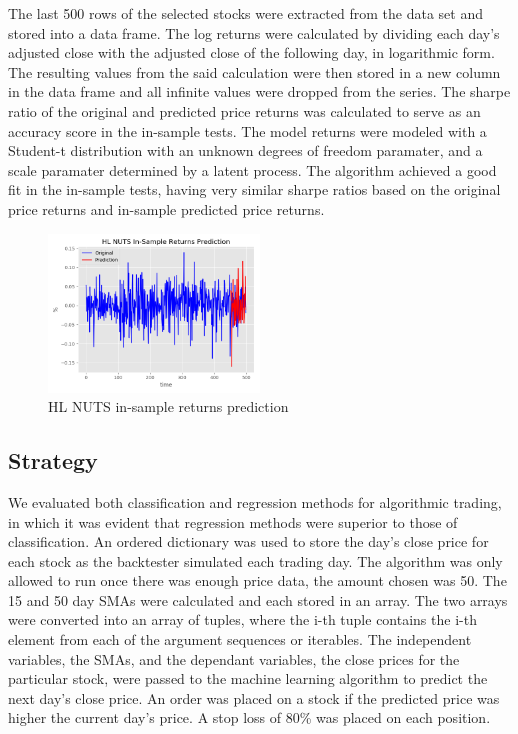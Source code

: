 \documentclass[times]{jtitauth}
\begin{document}
The last 500 rows of the selected stocks were extracted from the data set and stored into a data frame. The log returns were calculated by dividing each day’s adjusted close with the adjusted close of the following day, in logarithmic form. The resulting values from the said calculation were then stored in a new column in the data frame and all infinite values were dropped from the series. The sharpe ratio of the original and predicted price returns was calculated to serve as an accuracy score in the in-sample tests. The model returns were modeled with a Student-t distribution with an unknown degrees of freedom paramater, and a scale paramater determined by a latent process. The algorithm achieved a good fit in the in-sample tests, having very similar sharpe ratios based on the original price returns and in-sample predicted price returns.

\begin{figure}[!hbp]
\includegraphics[width=0.5\textwidth]{HL-NUTS-In-Sample-Returns-Prediction.png}
\caption{HL NUTS in-sample returns prediction}
\end{figure}

\subsection{Strategy}

We evaluated both classification and regression methods for algorithmic trading, in which it was evident that regression methods were superior to those of classification. An ordered dictionary was used to store the day's close price for each stock as the backtester simulated each trading day. The algorithm was only allowed to run once there was enough price data, the amount chosen was 50. The 15 and 50 day SMAs were calculated and each stored in an array. The two arrays were converted into an array of tuples, where the i-th tuple contains the i-th element from each of the argument sequences or iterables. The independent variables, the SMAs, and the dependant variables, the close prices for the particular stock, were passed to the machine learning algorithm to predict the next day's close price. An order was placed on a stock if the predicted price was higher the current day's price. A stop loss of 80\% was placed on each position. 
\end{document}
